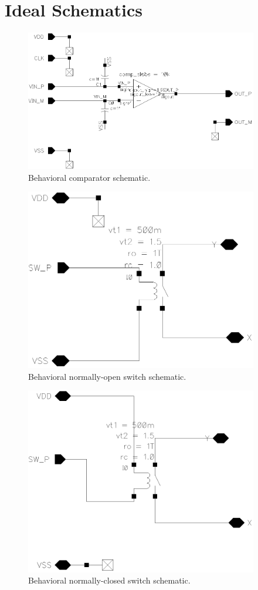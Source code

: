 \documentclass[11pt,letterpaper]{article}
\begin{document}
\renewcommand{\thesection}{A}
\section{Ideal Schematics}\label{app1}

\begin{figure}[htbp!]
    \centering
    \includegraphics[width=4in]{images/comp_ideal.eps}
    \caption{Behavioral comparator schematic.}\label{fig:comp_ideal}
\end{figure}

\begin{figure}[htbp!]
    \centering
    \includegraphics[width=4in]{images/no_ideal.eps}
    \caption{Behavioral normally-open switch schematic.}\label{fig:sw_no_ideal}
\end{figure}

\begin{figure}[htbp!]
    \centering
    \includegraphics[width=4in]{images/nc_ideal.eps}
    \caption{Behavioral normally-closed switch schematic.}\label{fig:sw_nc_ideal}
\end{figure}
\end{document}
